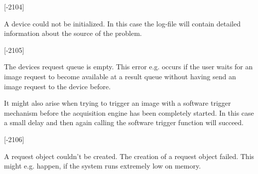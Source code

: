 \begin{Desc}
\begin{description}
{\bfseries }\mbox{[}-\/2104\mbox{]} \item[{\em 
\hypertarget{group___common_interface_gga112225e5fbaaaef6445ff4ebf98f8e03a5816ba30bd0e864e845ddf95ba72b3ca}{D\+M\+R\+\_\+\+D\+R\+V\+\_\+\+C\+A\+N\+N\+O\+T\+\_\+\+O\+P\+E\+N}\label{group___common_interface_gga112225e5fbaaaef6445ff4ebf98f8e03a5816ba30bd0e864e845ddf95ba72b3ca}
}]A device could not be initialized. In this case the log-\/file will contain detailed information about the source of the problem.

{\bfseries }\mbox{[}-\/2105\mbox{]} \item[{\em 
\hypertarget{group___common_interface_gga112225e5fbaaaef6445ff4ebf98f8e03a671b76e94b42fa0991c7defdf323a2c7}{D\+M\+R\+\_\+\+D\+E\+V\+\_\+\+R\+E\+Q\+U\+E\+S\+T\+\_\+\+Q\+U\+E\+U\+E\+\_\+\+E\+M\+P\+T\+Y}\label{group___common_interface_gga112225e5fbaaaef6445ff4ebf98f8e03a671b76e94b42fa0991c7defdf323a2c7}
}]The devices request queue is empty. This error e.\+g. occurs if the user waits for an image request to become available at a result queue without having send an image request to the device before.

It might also arise when trying to trigger an image with a software trigger mechanism before the acquisition engine has been completely started. In this case a small delay and then again calling the software trigger function will succeed.

{\bfseries }\mbox{[}-\/2106\mbox{]} \item[{\em 
\hypertarget{group___common_interface_gga112225e5fbaaaef6445ff4ebf98f8e03a4b168e8627ee0c4103a2b032a7c9547e}{D\+M\+R\+\_\+\+D\+E\+V\+\_\+\+R\+E\+Q\+U\+E\+S\+T\+\_\+\+C\+R\+E\+A\+T\+I\+O\+N\+\_\+\+F\+A\+I\+L\+E\+D}\label{group___common_interface_gga112225e5fbaaaef6445ff4ebf98f8e03a4b168e8627ee0c4103a2b032a7c9547e}
}]A request object couldn't be created. The creation of a request object failed. This might e.\+g. happen, if the system runs extremely low on memory.


\end{description}
\end{Desc}
